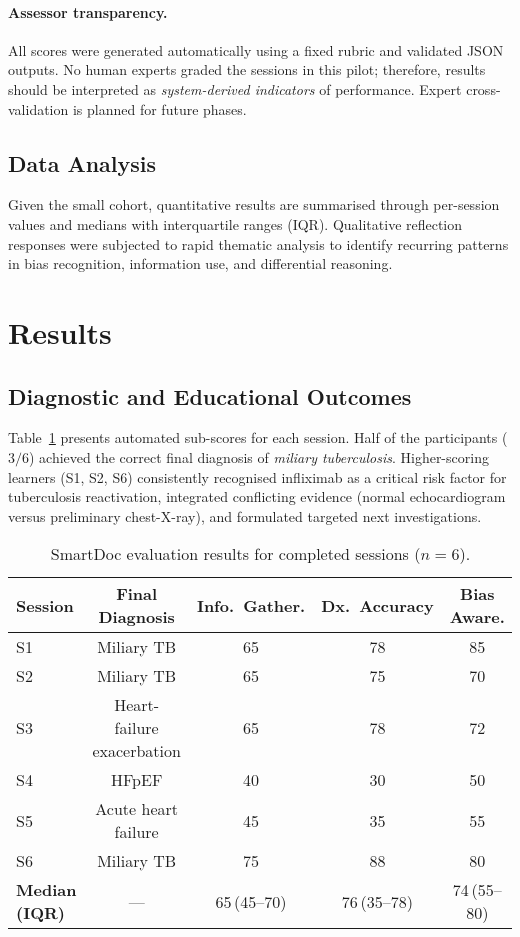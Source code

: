 \paragraph{Assessor transparency.}
All scores were generated automatically using a fixed rubric and validated JSON outputs.
No human experts graded the sessions in this pilot; therefore, results should be interpreted
as \textit{system-derived indicators} of performance.  
Expert cross-validation is planned for future phases.

\subsection{Data Analysis}

Given the small cohort, quantitative results are summarised through per-session values and
medians with interquartile ranges (IQR).  
Qualitative reflection responses were subjected to rapid thematic analysis to identify
recurring patterns in bias recognition, information use, and differential reasoning.

\section{Results}

\subsection{Diagnostic and Educational Outcomes}

Table~\ref{tab:evaluation_results} presents automated sub-scores for each session.
Half of the participants (\(3/6\)) achieved the correct final diagnosis of
\textit{miliary tuberculosis}.  
Higher-scoring learners (S1, S2, S6) consistently recognised infliximab as a critical
risk factor for tuberculosis reactivation, integrated conflicting evidence
(normal echocardiogram versus preliminary chest-X-ray), and formulated targeted next
investigations.

\begin{table}[h]
\centering
\caption{SmartDoc evaluation results for completed sessions (\(n=6\)).}
\label{tab:evaluation_results}
\begin{tabular}{lcccc}
\toprule
\textbf{Session} & \textbf{Final Diagnosis} &
\textbf{Info.\ Gather.} & \textbf{Dx.\ Accuracy} & \textbf{Bias Aware.} \\
\midrule
S1 & Miliary TB                 & 65 & 78 & 85 \\
S2 & Miliary TB                 & 65 & 75 & 70 \\
S3 & Heart-failure exacerbation & 65 & 78 & 72 \\
S4 & HFpEF                      & 40 & 30 & 50 \\
S5 & Acute heart failure        & 45 & 35 & 55 \\
S6 & Miliary TB                 & 75 & 88 & 80 \\
\midrule
\textbf{Median (IQR)} & --- & 65\,(45–70) & 76\,(35–78) & 74\,(55–80) \\
\bottomrule
\end{tabular}
\end{table}

